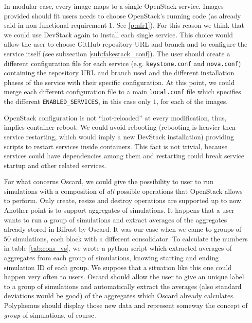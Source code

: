 In modular case, every image maps to a single OpenStack service. Images provided should fit users needs to choose OpenStack's running code (as already said in non-functional requirement $1$. See \ref{p:nfr1}). For this reason we think that we could use DevStack again to install each single service. This choice would allow the user to choose GitHub repository URL and branch and to configure the service itself (see subsection \ref{sub:fakestack_conf}). The user should create a different configuration file for each service (e.g. \texttt{keystone.conf} and \texttt{nova.conf}) containing the repository URL and branch used and the different installation phases of the service with their specific configuration. At this point, we could merge each different configuration file to a main \texttt{local.conf} file which specifies the different \texttt{ENABLED\_SERVICES}, in this case only $1$, for each of the images.

OpenStack configuration is not ``hot-reloaded'' at every modification, thus, implies container reboot. We could avoid rebooting (rebooting is heavier then service restarting, which would imply a new DevStack installation) providing scripts to restart services inside containers. This fact is not trivial, because services could have dependencies among them and restarting could break service startup and other related services. 

For what concerns Oscard, we could give the possibility to user to run simulations with a composition of \emph{all} possible operations that OpenStack allows to perform. Only create, resize and destroy operations are supported up to now. Another point is to support aggregates of simulations. It happens that a user wants to run a group of simulations and extract averages of the aggregates already stored in Bifrost by Oscard. It was our case when we came to groups of $50$ simulations, each block with a different consolidator. To calculate the numbers in table \ref{tab:cons_vs}, we wrote a python script which extracted averages of aggregates from each group of simulations, knowing starting and ending simulation ID of each group. We suppose that a situation like this one could happen very often to users. Oscard should allow the user to give an unique label to a group of simulations and automatically extract the averages (also standard deviations would be good) of the aggregates which Oscard already calculates. Polyphemus should display those new data and represent someway the concept of \emph{group} of simulations, of course.

